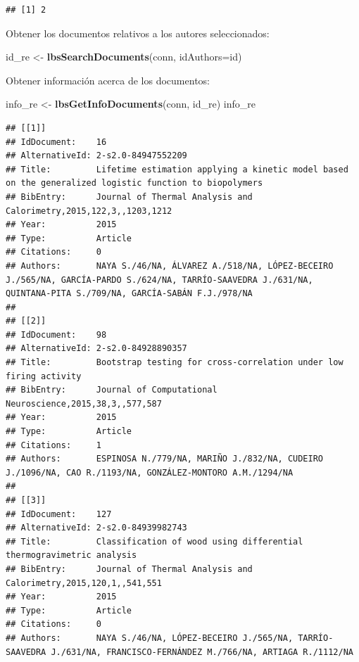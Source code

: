 \documentclass[
]{book}
\newenvironment{Shaded}{\begin{snugshade}}{\end{snugshade}}
\newcommand{\DataTypeTok}[1]{\textcolor[rgb]{0.13,0.29,0.53}{#1}}
\newcommand{\KeywordTok}[1]{\textcolor[rgb]{0.13,0.29,0.53}{\textbf{#1}}}
\newcommand{\NormalTok}[1]{#1}
\newcommand{\StringTok}[1]{\textcolor[rgb]{0.31,0.60,0.02}{#1}}
\begin{document}
\begin{verbatim}
## [1] 2
\end{verbatim}

Obtener los documentos relativos a los autores seleccionados:

\begin{Shaded}
\begin{Highlighting}[]
\NormalTok{id_re  <-}\StringTok{  }\KeywordTok{lbsSearchDocuments}\NormalTok{(conn, }\DataTypeTok{idAuthors=}\NormalTok{id)}
\end{Highlighting}
\end{Shaded}

Obtener información acerca de los documentos:

\begin{Shaded}
\begin{Highlighting}[]
\NormalTok{info_re <-}\StringTok{ }\KeywordTok{lbsGetInfoDocuments}\NormalTok{(conn, id_re)}
\NormalTok{info_re}
\end{Highlighting}
\end{Shaded}

\begin{verbatim}
## [[1]]
## IdDocument:    16
## AlternativeId: 2-s2.0-84947552209
## Title:         Lifetime estimation applying a kinetic model based on the generalized logistic function to biopolymers
## BibEntry:      Journal of Thermal Analysis and Calorimetry,2015,122,3,,1203,1212
## Year:          2015
## Type:          Article
## Citations:     0
## Authors:       NAYA S./46/NA, ÁLVAREZ A./518/NA, LÓPEZ-BECEIRO J./565/NA, GARCÍA-PARDO S./624/NA, TARRÍO-SAAVEDRA J./631/NA, QUINTANA-PITA S./709/NA, GARCÍA-SABÁN F.J./978/NA
## 
## [[2]]
## IdDocument:    98
## AlternativeId: 2-s2.0-84928890357
## Title:         Bootstrap testing for cross-correlation under low firing activity
## BibEntry:      Journal of Computational Neuroscience,2015,38,3,,577,587
## Year:          2015
## Type:          Article
## Citations:     1
## Authors:       ESPINOSA N./779/NA, MARIÑO J./832/NA, CUDEIRO J./1096/NA, CAO R./1193/NA, GONZÁLEZ-MONTORO A.M./1294/NA
## 
## [[3]]
## IdDocument:    127
## AlternativeId: 2-s2.0-84939982743
## Title:         Classification of wood using differential thermogravimetric analysis
## BibEntry:      Journal of Thermal Analysis and Calorimetry,2015,120,1,,541,551
## Year:          2015
## Type:          Article
## Citations:     0
## Authors:       NAYA S./46/NA, LÓPEZ-BECEIRO J./565/NA, TARRÍO-SAAVEDRA J./631/NA, FRANCISCO-FERNÁNDEZ M./766/NA, ARTIAGA R./1112/NA
\end{verbatim}
\end{document}

